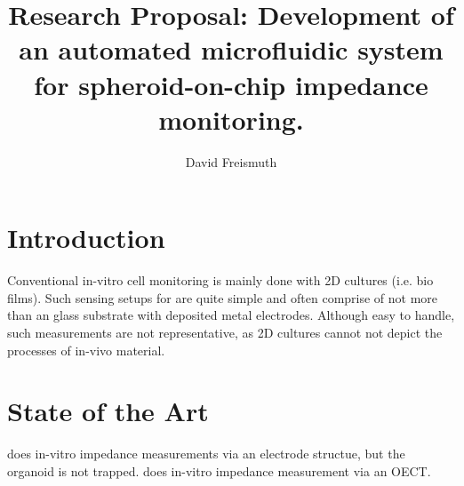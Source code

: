 \usepackage{cite}
\usepackage{pgfgantt}
\usepackage{pdflscape}
\usepackage{geometry}
\usepackage{cleveref}


\newcommand{\myWeek}{\themyWeekNum
    \stepcounter{myWeekNum}
    \ifnum\themyWeekNum=53
    \setcounter{myWeekNum}{1}
    \else\fi
}



\setcounter{myWeekNum}{39}
\title{Research Proposal: Development of an automated microfluidic system for spheroid-on-chip impedance monitoring.}
\author{David Freismuth}

\maketitle

 
\section{Introduction}
Conventional in-vitro cell monitoring is mainly done with 2D cultures (i.e. bio films). Such sensing setups for are quite simple and often comprise of not more than an glass substrate with deposited metal electrodes. Although easy to handle, such measurements are not representative, as 2D cultures cannot not depict the processes of in-vivo material. 


\section{State of the Art}
\cite{Gong2021} does in-vitro impedance measurements via an electrode structue, but the organoid is not trapped. 
\cite{Curto2018} does in-vitro impedance measurement via an OECT. 


